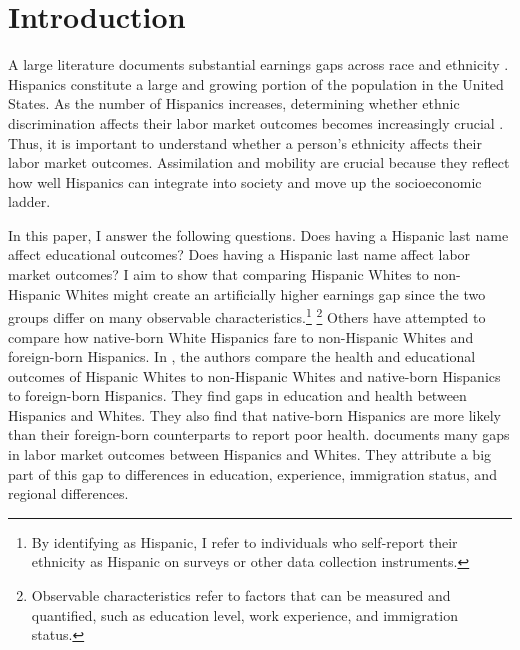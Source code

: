 
\section{Introduction}

A large literature documents substantial earnings gaps across race and ethnicity \autocite{bayer2018divergent, charles2008prejudice, card1992school, fryer2004causes, rubinstein2014pride, bertrand2004emily, juhn1991accounting}. Hispanics constitute a large and growing portion of the population in the United States. As the number of Hispanics increases, determining whether ethnic discrimination affects their labor market outcomes becomes increasingly crucial \autocite{chettyUnitedStatesStill2014, chettyEffectsExposureBetter2016,chettyFadingAmericanDream2017,abramitzkyImmigrantsAssimilateMore2020a, abramitzkyNationImmigrantsAssimilation2014,abramitzkyCulturalAssimilationAge2016,chettyWhereLandOpportunity2014}. Thus, it is important to understand whether a person's ethnicity affects their labor market outcomes. Assimilation and mobility are crucial because they reflect how well Hispanics can integrate into society and move up the socioeconomic ladder.

In this paper, I answer the following questions. Does having a Hispanic last name affect educational outcomes? Does having a Hispanic last name affect labor market outcomes? I aim to show that comparing Hispanic Whites to non-Hispanic Whites might create an artificially higher earnings gap since the two groups differ on many observable characteristics.\footnote{By identifying as Hispanic, I refer to individuals who self-report their ethnicity as Hispanic on surveys or other data collection instruments.} \footnote{Observable characteristics refer to factors that can be measured and quantified, such as education level, work experience, and immigration status.} Others have attempted to compare how native-born White Hispanics fare to non-Hispanic Whites and foreign-born Hispanics. In \textcite{antman2020ethnic,antmanEthnicAttritionObserved2016,antmanEthnicAttritionObserved2016a,antmanEthnicAttritionAssimilation2020}, the authors compare the health and educational outcomes of Hispanic Whites to non-Hispanic Whites and native-born Hispanics to foreign-born Hispanics. They find gaps in education and health between Hispanics and Whites. They also find that native-born Hispanics are more likely than their foreign-born counterparts to report poor health. \textcite{davilaChangesRelativeEarnings2008} documents many gaps in labor market outcomes between Hispanics and Whites. They attribute a big part of this gap to differences in education, experience, immigration status, and regional differences. 

